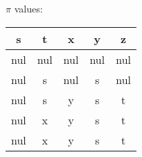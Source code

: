 \documentclass{report}
\begin{document}
{    \(\pi\) values: \\
    \begin{tabular}{|c|c|c|c|c|}
        \hline
        s & t & x & y & z \\
        \hline
        nul & nul & nul & nul & nul \\
        \hline
        nul & s & nul & s & nul \\
        \hline
        nul & s & y & s & t \\
        \hline
        nul & x & y & s & t \\
        \hline
        nul & x & y & s & t \\
        \hline
    \end{tabular}
}
\end{document}
